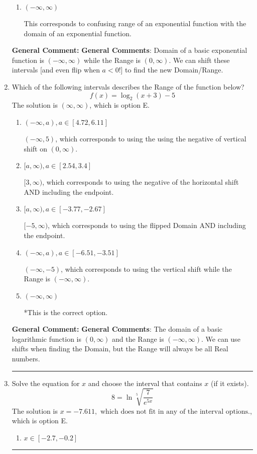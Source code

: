 \documentclass{extbook}[14pt]
\newcommand{\litem}[1]{\item #1

\rule{\textwidth}{0.4pt}}
\begin{document}
\begin{enumerate}
{\begin{enumerate}[label=\Alph*.]
* $(-7, \infty)$, which is the correct option.
\item \( (-\infty, \infty) \)

This corresponds to confusing range of an exponential function with the domain of an exponential function.
\end{enumerate}

\textbf{General Comment:} \textbf{General Comments}: Domain of a basic exponential function is $(-\infty, \infty)$ while the Range is $(0, \infty)$. We can shift these intervals [and even flip when $a<0$!] to find the new Domain/Range.
}
\litem{
Which of the following intervals describes the Range of the function below?
\[ f(x) = \log_2{(x+3)}-5 \]The solution is \( (\infty, \infty) \), which is option E.\begin{enumerate}[label=\Alph*.]
\item \( (-\infty, a), a \in [4.72, 6.11] \)

$(-\infty, 5)$, which corresponds to using the using the negative of vertical shift on $(0, \infty)$.
\item \( [a, \infty), a \in [2.54, 3.4] \)

$[3, \infty)$, which corresponds to using the negative of the horizontal shift AND including the endpoint.
\item \( [a, \infty), a \in [-3.77, -2.67] \)

$[-5, \infty)$, which corresponds to using the flipped Domain AND including the endpoint.
\item \( (-\infty, a), a \in [-6.51, -3.51] \)

$(-\infty, -5)$, which corresponds to using the vertical shift while the Range is $(-\infty, \infty)$.
\item \( (-\infty, \infty) \)

*This is the correct option.
\end{enumerate}

\textbf{General Comment:} \textbf{General Comments}: The domain of a basic logarithmic function is $(0, \infty)$ and the Range is $(-\infty, \infty)$. We can use shifts when finding the Domain, but the Range will always be all Real numbers.
}
\litem{
 Solve the equation for $x$ and choose the interval that contains $x$ (if it exists).
\[  8 = \ln{\sqrt[5]{\frac{7}{e^{5x}}}} \]The solution is \( x = -7.611, \text{ which does not fit in any of the interval options.} \), which is option E.\begin{enumerate}[label=\Alph*.]
\item \( x \in [-2.7, -0.2] \)


\end{enumerate}}
\end{enumerate}
\end{document}
